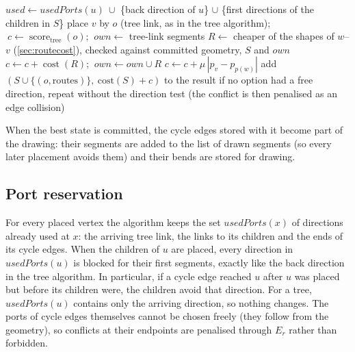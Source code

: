 \documentclass[11pt,a4paper]{article}
\newcommand{\Score}{\operatorname{score}}
\begin{document}
\begin{algorithm}[ht]
\caption{\textsc{Expand} with cycle edges (for child $v$ of $u$; beam $\mathcal B$, options $O$)}
\label{alg:expand}
\begin{algorithmic}[1]
  \State $\mathit{used}\gets \mathit{usedPorts}(u)\ \cup$ \{back direction of $u$\} $\cup$ \{first directions of the children in $S$\}
     \State place $v$ by $o$ (tree link, as in the tree algorithm); $\ c\gets\Score_{\text{tree}}(o)$; $\ \mathit{own}\gets$ tree-link segments
           \State $R\gets$ cheaper of the shapes of $w$--$v$ (\cref{sec:routecost}), checked against committed geometry, $S$ and $\mathit{own}$
           \State $c\gets c+\operatorname{cost}(R)$; $\ \mathit{own}\gets\mathit{own}\cup R$
         \State $c\gets c+\mu\,|p_v-p_{p(w)}|$ \EndIf
     \EndFor
     \State add $(S\cup\{(o,\text{routes})\},\ \mathrm{cost}(S)+c)$ to the result
  \EndFor
\EndFor
\State if no option had a free direction, repeat without the direction test (the conflict is then penalised as an edge collision)
\end{algorithmic}
\end{algorithm}

When the best state is committed, the cycle edges stored with it become part of the drawing: their segments are added to the list of drawn segments (so every later placement avoids them) and their bends are stored for drawing.

\subsection{Port reservation}
\label{sec:ports}

For every placed vertex the algorithm keeps the set $\mathit{usedPorts}(x)$ of directions already used at $x$: the arriving tree link, the links to its children and the ends of its cycle edges. When the children of $u$ are placed, every direction in $\mathit{usedPorts}(u)$ is blocked for their first segments, exactly like the back direction in the tree algorithm. In particular, if a cycle edge reached $u$ after $u$ was placed but before its children were, the children avoid that direction. For a tree, $\mathit{usedPorts}(u)$ contains only the arriving direction, so nothing changes. The ports of cycle edges themselves cannot be chosen freely (they follow from the geometry), so conflicts at their endpoints are penalised through $E_r$ rather than forbidden.
\end{document}
